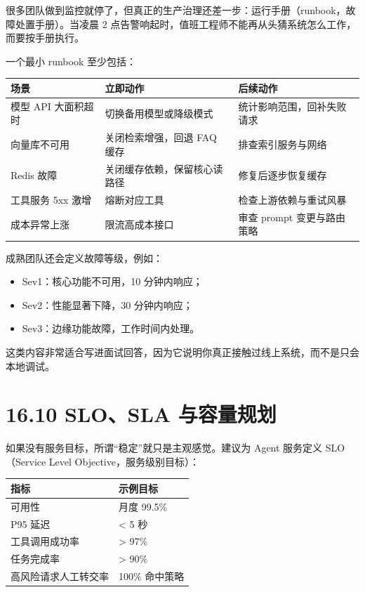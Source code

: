 很多团队做到监控就停了，但真正的生产治理还差一步：运行手册（runbook，故障处置手册）。当凌晨 2 点告警响起时，值班工程师不能再从头猜系统怎么工作，而要按手册执行。


一个最小 runbook 至少包括：


\begingroup
\scriptsize
\setlength{\tabcolsep}{3pt}
\begin{longtable}{|p{}|p{}|p{}|}
\hline
场景 & 立即动作 & 后续动作 \\ \hline
模型 API 大面积超时 & 切换备用模型或降级模式 & 统计影响范围，回补失败请求 \\ \hline
向量库不可用 & 关闭检索增强，回退 FAQ 缓存 & 排查索引服务与网络 \\ \hline
Redis 故障 & 关闭缓存依赖，保留核心读路径 & 修复后逐步恢复缓存 \\ \hline
工具服务 5xx 激增 & 熔断对应工具 & 检查上游依赖与重试风暴 \\ \hline
成本异常上涨 & 限流高成本接口 & 审查 prompt 变更与路由策略 \\ \hline
\end{longtable}
\endgroup

成熟团队还会定义故障等级，例如：


\begin{itemize}[leftmargin=2em]
\item Sev1：核心功能不可用，10 分钟内响应；
\item Sev2：性能显著下降，30 分钟内响应；
\item Sev3：边缘功能故障，工作时间内处理。
\end{itemize}

这类内容非常适合写进面试回答，因为它说明你真正接触过线上系统，而不是只会本地调试。


\section{16.10 SLO、SLA 与容量规划}

如果没有服务目标，所谓``稳定''就只是主观感觉。建议为 Agent 服务定义 SLO（Service Level Objective，服务级别目标）：


\begingroup
\scriptsize
\setlength{\tabcolsep}{3pt}
\begin{longtable}{|p{}|p{}|}
\hline
指标 & 示例目标 \\ \hline
可用性 & 月度 99.5\% \\ \hline
P95 延迟 & < 5 秒 \\ \hline
工具调用成功率 & > 97\% \\ \hline
任务完成率 & > 90\% \\ \hline
高风险请求人工转交率 & 100\% 命中策略 \\ \hline
\end{longtable}
\endgroup

